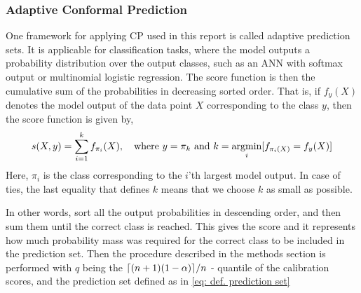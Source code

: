 \subsubsection{Adaptive Conformal Prediction}
%
One framework for applying CP used in this report is called adaptive prediction sets. It is applicable for classification tasks, where the model outputs a probability distribution over the output classes, such as an ANN with softmax output or multinomial logistic regression.
The score function is then the cumulative sum of the probabilities in decreasing sorted order. That is, if $f_y(X)$ denotes the model output of the data point $X$ corresponding to the class $y$, then the score function is given by,
%
\begin{gather}
    s(X,y)=\sum_{i = 1}^k f_{\pi_i}(X), \quad \text{where $y = \pi_k$ and }k = \operatorname*{\text{argmin}}_{i} [f_{\pi_i(X)} = f_y(X)]
\end{gather}
Here, $\pi_i$ is the class corresponding to the $i$'th largest model output. In case of ties, the last equality that defines $k$ means that we choose $k$ as small as possible.
%
%

In other words, sort all the output probabilities in descending order, and then sum them until the correct class is reached. This gives the score
and it represents how much probability mass was required for the correct class to be included in the prediction set.
%
Then the procedure described in the methods section is performed with $\hat q$ being the $\lceil {(n+1)(1-\alpha)} \rceil/n$ - quantile of the calibration scores, and the prediction set defined as in \cref{eq: def. prediction set}


